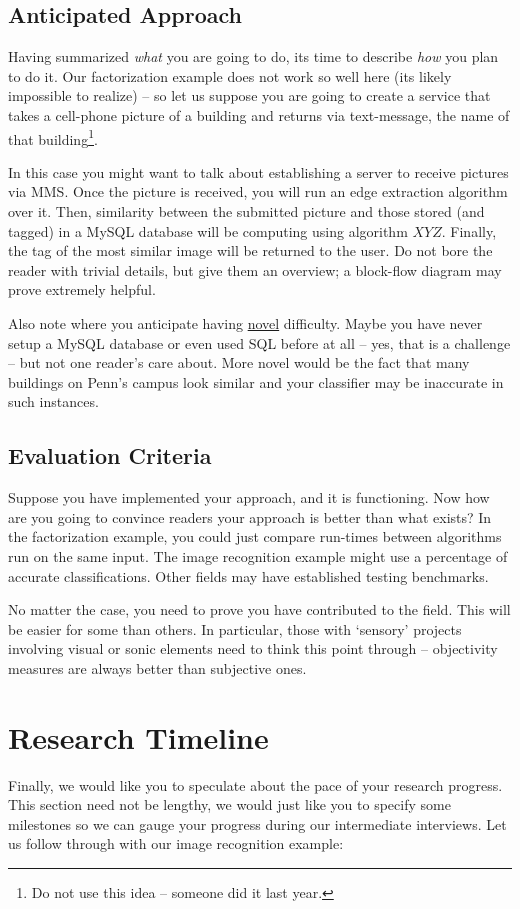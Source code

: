 \documentclass{sig-alternate}
\begin{document}
\subsection{Anticipated Approach}
\label{subsec:approach}
Having summarized \textit{what} you are going to do, its time to describe \textit{how} you plan to do it. Our factorization example does not work so well here (its likely impossible to realize) -- so let us suppose you are going to create a service that takes a cell-phone picture of a building and returns via text-message, the name of that building\footnote{Do not use this idea -- someone did it last year.}. 

In this case you might want to talk about establishing a server to receive pictures via MMS. Once the picture is received, you will run an edge extraction algorithm over it. Then, similarity between the submitted picture and those stored (and tagged) in a MySQL database will be computing using algorithm $XYZ$. Finally, the tag of the most similar image will be returned to the user. Do not bore the reader with trivial details, but give them an overview; a block-flow diagram may prove extremely helpful.

Also note where you anticipate having \underline{novel} difficulty. Maybe you have never setup a MySQL database or even used SQL before at all -- yes, that is a challenge -- but not one reader's care about. More novel would be the fact that many buildings on Penn's campus look similar and your classifier may be inaccurate in such instances.

\subsection{Evaluation Criteria}
\label{subsec:eval_criteria}
Suppose you have implemented your approach, and it is functioning. Now how are you going to convince readers your approach is better than what exists? In the factorization example, you could just compare run-times between algorithms run on the same input. The image recognition example might use a percentage of accurate classifications. Other fields may have established testing benchmarks.

No matter the case, you need to prove you have contributed to the field. This will be easier for some than others. In particular, those with `sensory' projects involving visual or sonic elements need to think this point through -- objectivity measures are always better than subjective ones.

\section{Research Timeline}
\label{sec:research_timeline}
Finally, we would like you to speculate about the pace of your research progress. This section need not be lengthy, we would just like you to specify some milestones so we can gauge your progress during our intermediate interviews. Let us follow through with our image recognition example:
\end{document}
